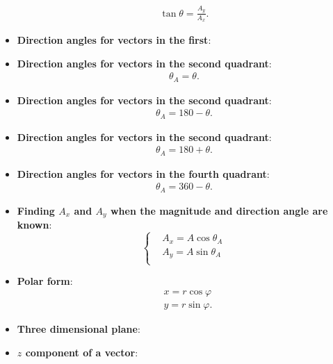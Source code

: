 \documentclass{report}
\begin{document}
\begin{itemize}
            \begin{align*}
                \tan{\theta } = \frac{A_{y}}{A_{x}}
            .\end{align*}
        \item \textbf{Direction angles for vectors in the first}:
        \item \textbf{Direction angles for vectors in the second quadrant}:
            \begin{align*}
                \theta_{A} = \theta 
            .\end{align*}
        \item \textbf{Direction angles for vectors in the second quadrant}:
            \begin{align*}
                \theta_{A} = 180 - \theta 
            .\end{align*}
        \item \textbf{Direction angles for vectors in the second quadrant}:
            \begin{align*}
                \theta_{A} = 180 + \theta 
            .\end{align*}
        \item \textbf{Direction angles for vectors in the fourth quadrant}:
            \begin{align*}
                \theta_{A} = 360 - \theta 
            .\end{align*}
        \item \textbf{Finding $A_{x}$ and $A_{y}$  when the magnitude and direction angle are known}:
        \begin{equation}
            \begin{cases}
                &A_{x} = A\cos{\theta_{A}} \\
                &A_{y} = A\sin{\theta_{A}} \\
            \end{cases}
        \end{equation}
        \item \textbf{Polar form}:
            \begin{align*}
                &x = r\cos{\varphi} \\
                &y = r\sin{\varphi}
            .\end{align*}
        \item \textbf{Three dimensional plane}:
            \bigbreak \noindent 
        \item \textbf{$z$ component of a vector}:

\end{itemize}
\end{document}
